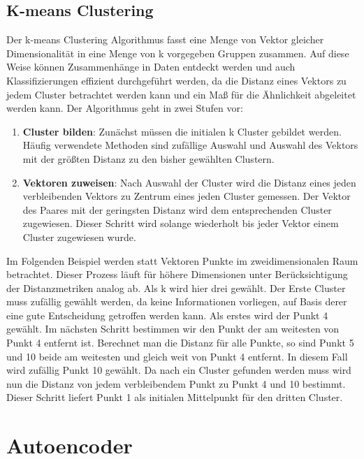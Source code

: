\subsection{K-means Clustering}

Der k-means Clustering Algorithmus fasst eine Menge von Vektor gleicher Dimensionalität in eine Menge von k vorgegeben Gruppen zusammen. Auf diese Weise können Zusammenhänge in Daten entdeckt werden und auch Klassifizierungen effizient durchgeführt werden, da die Distanz eines Vektors zu jedem Cluster betrachtet werden kann und ein Maß für die Ähnlichkeit abgeleitet werden kann. Der Algorithmus geht in zwei Stufen vor:

\begin{enumerate}
	\item \textbf{Cluster bilden}: Zunächst müssen die initialen k Cluster gebildet werden. Häufig verwendete Methoden sind zufällige Auswahl und Auswahl des Vektors mit der größten Distanz zu den bisher gewählten Clustern.
	\item \textbf{Vektoren zuweisen}: Nach Auswahl der Cluster wird die Distanz eines jeden verbleibenden Vektors zu Zentrum eines jeden Cluster gemessen. Der Vektor des Paares mit der geringsten Distanz wird dem entsprechenden Cluster zugewiesen. Dieser Schritt wird solange wiederholt bis jeder Vektor einem Cluster zugewiesen wurde.
\end{enumerate}

Im Folgenden Beispiel werden statt Vektoren Punkte im zweidimensionalen Raum betrachtet. Dieser Prozess läuft für höhere Dimensionen unter Berücksichtigung der Distanzmetriken analog ab. Als k wird hier drei gewählt. Der Erste Cluster muss zufällig gewählt werden, da keine Informationen vorliegen, auf Basis derer eine gute Entscheidung getroffen werden kann. Als erstes wird der Punkt 4 gewählt. Im nächsten Schritt bestimmen wir den Punkt der am weitesten von Punkt 4 entfernt ist. Berechnet man die Distanz für alle Punkte, so sind Punkt 5 und 10 beide am weitesten und gleich weit von Punkt 4 entfernt. In diesem Fall wird zufällig Punkt 10 gewählt. Da nach ein Cluster gefunden werden muss wird nun die Distanz von jedem verbleibendem Punkt zu Punkt 4 und 10 bestimmt. Dieser Schritt liefert Punkt 1 als initialen Mittelpunkt für den dritten Cluster.

\section{Autoencoder}

